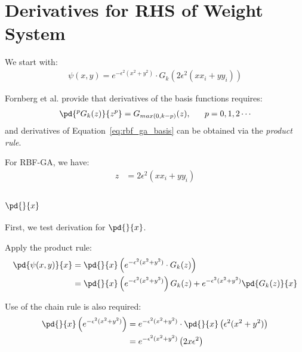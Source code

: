\documentclass[11pt]{report}
\begin{document}
\tableofcontents
\fi

{ \graphicspath{{rbffd_methods_content/}}

\chapter{Derivatives for RHS of Weight System}
We start with:
\begin{align} 
\psi (x,y) = e^{-\epsilon^2(x^2+y^2)} \cdot G_k(2\epsilon^2(x x_i +y y_i)) \label{eq:rbf_ga_basis}
\end{align}

Fornberg et al. \cite{FornbergLehtoPowell12} provide that derivatives of the basis functions requires:
\begin{align}
\pd{^p G_k(z)}{z^p} = G_{max(0,k-p)} (z), \ \ \ \ \ p = 0, 1, 2 \cdots 
\end{align}
and derivatives of Equation~\ref{eq:rbf_ga_basis} can be obtained via the \emph{product rule}. 

For RBF-GA, we have: 
\begin{align}
z & = 2\epsilon^2(x x_i + y y_i) \label{eq:gamma_z}
\end{align}

\section{$\pd{}{x}$}

First, we test derivation for $\pd{}{x}$. 

Apply the product rule: 
\begin{align}
\pd{\psi(x,y)}{x} & = \pd{}{x} \left( e^{-\epsilon^2(x^2+y^2)} \cdot G_k(z)  \right) \nonumber \\
& = \pd{}{x}\left( e^{-\epsilon^2 (x^2 + y^2)} \right) G_k(z) + e^{-\epsilon^2(x^2 + y^2)} \pd{G_k(z)}{x} \label{eq:x_product_rule}
\end{align}

Use of the chain rule is also required:
\begin{align}
\pd{}{x}\left( e^{-\epsilon^2 (x^2 + y^2)} \right) & = e^{-\epsilon^2 (x^2 + y^2)} \cdot \pd{}{x} \left( \epsilon^2(x^2+y^2) \right) \nonumber \\
        & = e^{-\epsilon^2 (x^2 + y^2)} \left(2x \epsilon^2 \right) \label{eq:x_part1}
\end{align}


}
\end{document}
